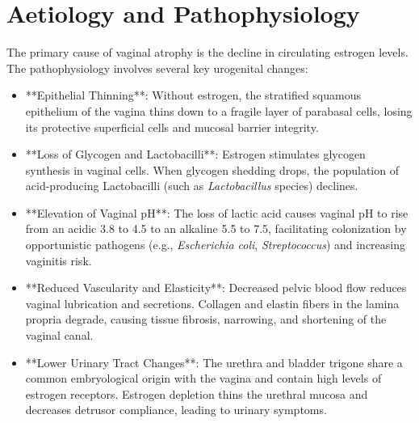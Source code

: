 \section*{Aetiology and Pathophysiology}
The primary cause of vaginal atrophy is the decline in circulating estrogen levels. The pathophysiology involves several key urogenital changes:
\begin{itemize}
\item **Epithelial Thinning**: Without estrogen, the stratified squamous epithelium of the vagina thins down to a fragile layer of parabasal cells, losing its protective superficial cells and mucosal barrier integrity.
\item **Loss of Glycogen and Lactobacilli**: Estrogen stimulates glycogen synthesis in vaginal cells. When glycogen shedding drops, the population of acid-producing Lactobacilli (such as \textit{Lactobacillus} species) declines.
\item **Elevation of Vaginal pH**: The loss of lactic acid causes vaginal pH to rise from an acidic 3.8 to 4.5 to an alkaline 5.5 to 7.5, facilitating colonization by opportunistic pathogens (e.g., \textit{Escherichia coli}, \textit{Streptococcus}) and increasing vaginitis risk.
\item **Reduced Vascularity and Elasticity**: Decreased pelvic blood flow reduces vaginal lubrication and secretions. Collagen and elastin fibers in the lamina propria degrade, causing tissue fibrosis, narrowing, and shortening of the vaginal canal.
\item **Lower Urinary Tract Changes**: The urethra and bladder trigone share a common embryological origin with the vagina and contain high levels of estrogen receptors. Estrogen depletion thins the urethral mucosa and decreases detrusor compliance, leading to urinary symptoms.
\end{itemize}

